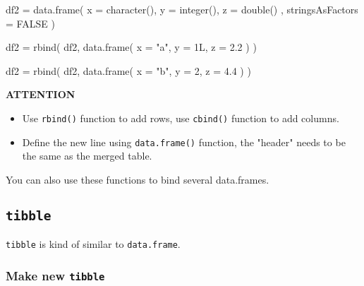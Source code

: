 \documentclass[
]{article}
\newenvironment{Shaded}{}{}
\newcommand{\AttributeTok}[1]{\textcolor[rgb]{0.49,0.56,0.16}{#1}}
\newcommand{\ConstantTok}[1]{\textcolor[rgb]{0.53,0.00,0.00}{#1}}
\newcommand{\DecValTok}[1]{\textcolor[rgb]{0.25,0.63,0.44}{#1}}
\newcommand{\FloatTok}[1]{\textcolor[rgb]{0.25,0.63,0.44}{#1}}
\newcommand{\FunctionTok}[1]{\textcolor[rgb]{0.02,0.16,0.49}{#1}}
\newcommand{\NormalTok}[1]{#1}
\newcommand{\OtherTok}[1]{\textcolor[rgb]{0.00,0.44,0.13}{#1}}
\newcommand{\StringTok}[1]{\textcolor[rgb]{0.25,0.44,0.63}{#1}}
\begin{document}
\begin{Shaded}
\begin{Highlighting}[]
\NormalTok{df2 }\OtherTok{=}
	\FunctionTok{data.frame}\NormalTok{( }
    \AttributeTok{x =} \FunctionTok{character}\NormalTok{(), }
    \AttributeTok{y =} \FunctionTok{integer}\NormalTok{(), }
    \AttributeTok{z =} \FunctionTok{double}\NormalTok{() , }
    \AttributeTok{stringsAsFactors =} \ConstantTok{FALSE} 
\NormalTok{  )}

\NormalTok{df2 }\OtherTok{=}
	\FunctionTok{rbind}\NormalTok{( }
\NormalTok{    df2, }
    \FunctionTok{data.frame}\NormalTok{(}
      \AttributeTok{x =} \StringTok{"a"}\NormalTok{,}
      \AttributeTok{y =}\NormalTok{ 1L, }
      \AttributeTok{z =} \FloatTok{2.2} 
\NormalTok{    ) }
\NormalTok{  )}

\NormalTok{df2 }\OtherTok{=}
	\FunctionTok{rbind}\NormalTok{( }
\NormalTok{    df2, }
    \FunctionTok{data.frame}\NormalTok{( }
      \AttributeTok{x =} \StringTok{"b"}\NormalTok{, }
      \AttributeTok{y =} \DecValTok{2}\NormalTok{, }
      \AttributeTok{z =} \FloatTok{4.4} 
\NormalTok{    ) }
\NormalTok{  )}
\end{Highlighting}
\end{Shaded}

\textbf{ATTENTION}

\begin{itemize}
\item
  Use \texttt{rbind()} function to add rows, use \texttt{cbind()}
  function to add columns.
\item
  Define the new line using \texttt{data.frame()} function, the "header"
  needs to be the same as the merged table.
\end{itemize}

You can also use these functions to bind several data.frames.

\hypertarget{tibble}{%
\subsection{\texorpdfstring{\texttt{tibble}}{tibble}}\label{tibble}}

\texttt{tibble} is kind of similar to \texttt{data.frame}.

\hypertarget{make-new-tibble}{%
\subsubsection{\texorpdfstring{Make new
\texttt{tibble}}{Make new tibble}}\label{make-new-tibble}}
\end{document}
